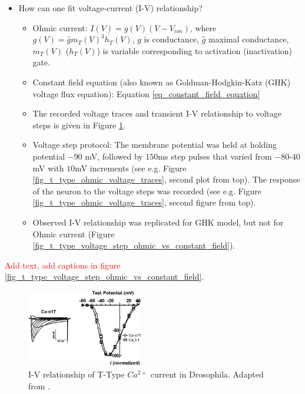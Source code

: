 \documentclass[../../workflow.tex]{subfiles}
\begin{document}
\begin{itemize}
    \item How can one fit voltage-current (I-V) relationship?
    \begin{itemize}
        \item Ohmic current: $I(V) = g(V) (V - V_{ion})$, where $g(V) = \hat{g} m_T(V)^3 h_T(V)$, $g$ is conductance,
        $\hat{g}$ maximal conductance, $m_T(V)$ ($h_T(V)$) is variable corresponding to
        activation (inactivation) gate.
        \item Constant field equation (also known as Goldman-Hodgkin-Katz (GHK) voltage flux equation): Equation \ref{eq_constant_field_equation}
        \item The recorded voltage traces and transient I-V relationship to voltage steps is given in Figure \ref{fig:i_v_relationship_jeong}.
        \item Voltage step protocol: The membrane potential was held at holding potential $-90$ mV,
        followed by $150$ms step pulses that varied from $-80$-$40$mV with $10$mV increments
        (see e.g. Figure \ref{fig_t_type_ohmic_voltage_traces}, second plot from top). The response
        of the neuron to the voltage steps was recorded (see e.g. Figure \ref{fig_t_type_ohmic_voltage_traces}, second figure from top).
        \item Observed I-V relationship was replicated for GHK model, but not for Ohmic current
        (Figure \ref{fig_t_type_voltage_step_ohmic_vs_constant_field}).
    \end{itemize}
\end{itemize}

\color{black}

\textcolor{red}{Add text, add captions in figure \ref{fig_t_type_voltage_step_ohmic_vs_constant_field}}.

\begin{figure}[H]
    \centering
    \includegraphics[width=0.45\textwidth]{./img/t_type_calcium_channel/iv_relationship_jeong_2015.png}
    \caption{I-V relationship of T-Type $Ca^{2+}$ current in Drosophila. Adapted from \cite{jeongCaa1TFlyTtype2015}.}
    \label{fig:i_v_relationship_jeong}
\end{figure}
\end{document}
